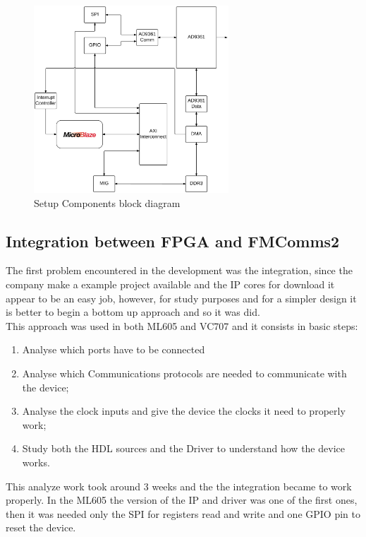 \begin{figure}[htbp]
    \centering
    \includegraphics[width=0.65\textwidth]{./figures/setup_ipbd}
    \caption{ Setup Components block diagram
    \label{fig:setupip}}
\end{figure}

\subsection{Integration between FPGA and FMComms2}

The first problem encountered in the development was the integration, since the
company make a example project available and the IP cores for download it appear
to be an easy job, however, for study purposes and for a simpler design it is
better to begin a bottom up approach and so it was did.\\

This approach was used in both ML605 and VC707 and it consists in basic steps:

\begin{enumerate}
    \item Analyse which ports have to be connected
    \item Analyse which Communications protocols are needed to communicate with the device;
    \item Analyse the clock inputs and give the device the clocks it need to properly work;
    \item Study both the HDL sources and the Driver to understand how the device works.
\end{enumerate}

This analyze work took around 3 weeks and the the integration became to work
properly. In the ML605 the version of the IP and driver was one of the first
ones, then it was needed only the SPI for registers read and write and one
GPIO pin to reset the device.\\

